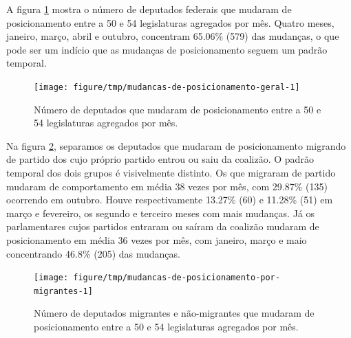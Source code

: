 \documentclass[a4paper,titlepage]{ppgi}\usepackage[]{graphicx}\usepackage[]{color}
\newenvironment{knitrout}{}{} %
\begin{document}
A figura \ref{fig:mudancas-de-posicionamento-geral} mostra o número de
deputados federais que mudaram de posicionamento entre a 50\textordfeminine{} e
54\textordfeminine{} legislaturas agregados por mês. Quatro meses, janeiro,
março, abril e outubro, concentram
65.06\%
(579) das mudanças, o que pode
ser um indício que as mudanças de posicionamento seguem um padrão temporal.

\begin{knitrout}
\color{fgcolor}\begin{figure}
\texttt{[image: figure/tmp/mudancas-de-posicionamento-geral-1]} \caption[Número de deputados que mudaram de posicionamento entre a 50\textordfeminine{} e 54\textordfeminine{} legislaturas agregados por mês]{Número de deputados que mudaram de posicionamento entre a 50\textordfeminine{} e 54\textordfeminine{} legislaturas agregados por mês.}\label{fig:mudancas-de-posicionamento-geral}
\end{figure}


\end{knitrout}

Na figura \ref{fig:mudancas-de-posicionamento-por-migrantes}, separamos os
deputados que mudaram de posicionamento migrando de partido dos cujo próprio
partido entrou ou saiu da coalizão. O padrão temporal dos dois grupos é
visivelmente distinto. Os que migraram de partido mudaram de comportamento em
média 38 vezes por mês, com
29.87\%
(135) ocorrendo em outubro. Houve respectivamente
13.27\%
(60) e
11.28\%
(51) em março e fevereiro, os segundo e terceiro
meses com mais mudanças. Já os parlamentares cujos partidos entraram ou saíram
da coalizão mudaram de posicionamento em média
36 vezes por mês, com janeiro, março e
maio concentrando
46.8\%
(205) das mudanças.

\begin{knitrout}
\color{fgcolor}\begin{figure}
\texttt{[image: figure/tmp/mudancas-de-posicionamento-por-migrantes-1]} \caption[Número de deputados migrantes e não-migrantes que mudaram de posicionamento entre a 50\textordfeminine{} e 54\textordfeminine{} legislaturas agregados por mês]{Número de deputados migrantes e não-migrantes que mudaram de posicionamento entre a 50\textordfeminine{} e 54\textordfeminine{} legislaturas agregados por mês.}\label{fig:mudancas-de-posicionamento-por-migrantes}
\end{figure}


\end{knitrout}
\end{document}
